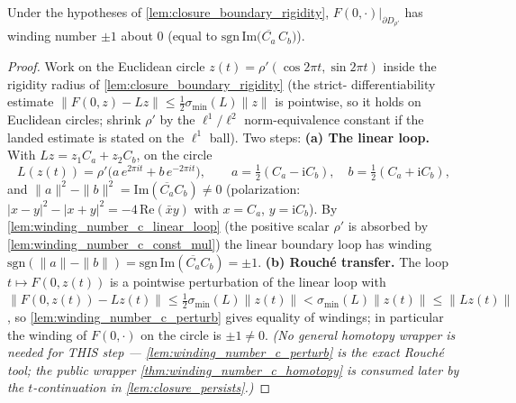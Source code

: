 \begin{lemma}[winding $\pm1$ at $t=0$]
  \label{lem:closure_winding_t0}
  Under the hypotheses of \cref{lem:closure_boundary_rigidity},
  $F(0,\cdot)|_{\partial D_{\rho'}}$ has winding number $\pm1$ about $0$
  (equal to $\mathrm{sgn}\,\mathrm{Im}\bigl(\overline{C_a}\,C_b\bigr)$).
\end{lemma}
\begin{proof}
  Work on the Euclidean circle $z(t) = \rho'(\cos 2\pi t, \sin 2\pi t)$ inside
  the rigidity radius of \cref{lem:closure_boundary_rigidity} (the strict-%
  differentiability estimate $\|F(0,z) - Lz\| \le \tfrac12\sigma_{\min}(L)
  \|z\|$ is pointwise, so it holds on Euclidean circles; shrink $\rho'$ by the
  $\ell^1\!/\ell^2$ norm-equivalence constant if the landed estimate is stated
  on the $\ell^1$ ball). Two steps:
  \textbf{(a) The linear loop.} With $L z = z_1 C_a + z_2 C_b$, on the circle
  \[
    L(z(t)) = \rho'\bigl(a\,e^{2\pi i t} + b\,e^{-2\pi i t}\bigr), \qquad
    a = \tfrac12(C_a - \mathrm{i}C_b),\quad b = \tfrac12(C_a + \mathrm{i}C_b),
  \]
  and $\|a\|^2 - \|b\|^2 = \mathrm{Im}(\overline{C_a}C_b) \ne 0$ (polarization:
  $|x-y|^2 - |x+y|^2 = -4\,\mathrm{Re}(\bar x y)$ with $x = C_a$,
  $y = \mathrm{i}C_b$). By \cref{lem:winding_number_c_linear_loop} (the
  positive scalar $\rho'$ is absorbed by
  \cref{lem:winding_number_c_const_mul}) the linear boundary loop has winding
  $\mathrm{sgn}(\|a\| - \|b\|) = \mathrm{sgn}\,\mathrm{Im}(\overline{C_a}C_b)
  = \pm1$.
  \textbf{(b) Rou\-ch\'e transfer.} The loop $t \mapsto F(0, z(t))$ is a
  pointwise perturbation of the linear loop with
  $\|F(0,z(t)) - L z(t)\| \le \tfrac12\sigma_{\min}(L)\|z(t)\| <
  \sigma_{\min}(L)\|z(t)\| \le \|L z(t)\|$, so
  \cref{lem:winding_number_c_perturb} gives equality of windings; in
  particular the winding of $F(0,\cdot)$ on the circle is $\pm1 \ne 0$.
  \emph{(No general homotopy wrapper is needed for THIS step ---
  \cref{lem:winding_number_c_perturb} is the exact Rou\-ch\'e tool; the public
  wrapper \cref{thm:winding_number_c_homotopy} is consumed later by the
  $t$-continuation in \cref{lem:closure_persists}.)}
\end{proof}

